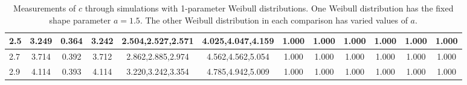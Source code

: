 \begin{table*}[h!]
\begin{center}
\begin{tabular}{| l | c | c | c | c | c | c | c | c | c | c | c |}
2.5 & 3.249 & 0.364 & 3.242 & 2.504,2.527,2.571 & 4.025,4.047,4.159  & 1.000  & 1.000  & 1.000  & 1.000  & 1.000  & 1.000 \\\hline
2.7 & 3.714 & 0.392 & 3.712 & 2.862,2.885,2.974 & 4.562,4.562,5.054  & 1.000  & 1.000  & 1.000  & 1.000  & 1.000  & 1.000 \\\hline
2.9 & 4.114 & 0.393 & 4.114 & 3.220,3.242,3.354 & 4.785,4.942,5.009  & 1.000  & 1.000  & 1.000  & 1.000  & 1.000  & 1.000 \\\hline
\end{tabular}
\caption{Measurements of $c$ through simulations
with 1-parameter Weibull distributions.
One Weibull distribution has the fixed shape parameter $a=1.5$.
The other Weibull distribution in each comparison
has varied values of $a$.}
\end{center}
\end{table*}